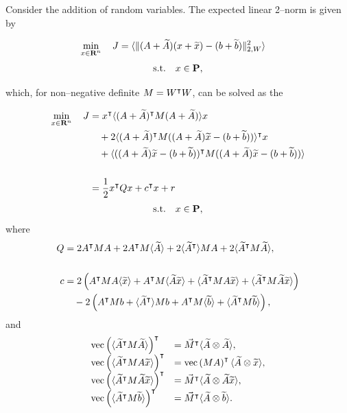 \documentclass{article}
\begin{document}
    Consider the addition of random variables.
    The expected linear 2--norm is given by

    \begin{align*}
        \min_{x\in\textbf{R}^n}\quad J&=\langle\|(A+\widetilde{A})(x+\widetilde{x})-(b+\widetilde{b})\|_{2,W}^2\rangle
    \end{align*}
    \begin{align*}
        \text{s.t.}\quad x\in\textbf{P},
    \end{align*}

    which, for non--negative definite $M=W^\intercal W$, can be solved as the \QP

    \begin{align*}
        \min_{x\in\textbf{R}^n}\quad J&=x^\intercal\langle(A+\widetilde{A})^\intercal M (A+\widetilde{A})\rangle x\\
        &\quad+
        2\langle(A+\widetilde{A})^\intercal M ((A+\widetilde{A})\widetilde{x}-(b+\widetilde{b}))\rangle^\intercal x\\
        &\quad+
        \langle((A+\widetilde{A})\widetilde{x}
        -(b+\widetilde{b}))^\intercal M ((A+\widetilde{A})\widetilde{x}
        -(b+\widetilde{b}))\rangle\\\\
        &=\frac{1}{2}x^\intercal Q x + c^\intercal x + r
    \end{align*}  
    \begin{align*}
        \text{s.t.}\quad x\in\textbf{P},
    \end{align*}  
    where    
    \begin{align*}
        Q   &=2A^\intercal M A + 2A^\intercal M \langle\widetilde{A}\rangle + 2\langle\widetilde{A}^\intercal\rangle M A + 2\langle\widetilde{A}^\intercal M \widetilde{A} \rangle,\\
        \\
        c&=
        2\left(A^\intercal MA\langle\widetilde{x}\rangle
        +A^\intercal M\langle\widetilde{A}\widetilde{x}\rangle
        +\langle\widetilde{A}^\intercal MA\widetilde{x}\rangle
        +\langle\widetilde{A}^\intercal M\widetilde{A}\widetilde{x}\rangle\right)\\
        &\quad
        -2\left(A^\intercal Mb
        +\langle\widetilde{A}^\intercal\rangle Mb
        +A^\intercal M\langle\widetilde{b}\rangle
        +\langle\widetilde{A}^\intercal M\widetilde{b}\rangle\right),
    \end{align*}
    and
    \begin{align*} 
    \begin{array}{ll}
            \mathrm{vec}\left(\langle\widetilde{A}^\intercal M \widetilde{A} \rangle\right)^\intercal
                &=\vec{M}^\intercal\langle\widetilde{A}\otimes \widetilde{A}\rangle ,\\
            \mathrm{vec}\left(\langle\widetilde{A}^\intercal MA\widetilde{x}\rangle\right)^\intercal
                &=\mathrm{vec}\left(MA\right)^\intercal\langle\widetilde{A}\otimes \widetilde{x}\rangle,\\
            \mathrm{vec}\left(\langle\widetilde{A}^\intercal M\widetilde{A}\widetilde{x}\rangle\right)^\intercal
                &=\vec{M}^\intercal\langle \widetilde{A} \otimes \widetilde{A}\widetilde{x} \rangle,\\
            \mathrm{vec}\left(\langle\widetilde{A}^\intercal M\widetilde{b}\rangle\right)^\intercal
                &=\vec{M}^\intercal\langle\widetilde{A} \otimes \widetilde{b}\rangle.
    \end{array}
    \end{align*}
\end{document}
